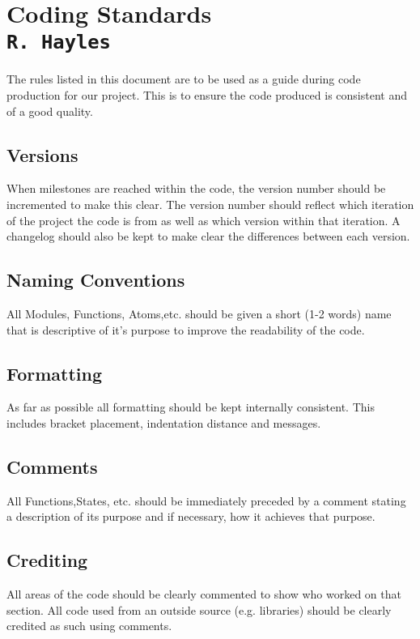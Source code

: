 \section{Coding Standards\\{\small\tt R.~Hayles}}
The rules listed in this document are to be used as a guide during code production for our project. This is to ensure the code produced is consistent and of a good quality.

\subsection{Versions}
When milestones are reached within the code, the version number should be incremented to make this clear. The version number should reflect which iteration of the project the code is from as well as which version within that iteration. A changelog should also be kept to make clear the differences between each version.
\subsection{Naming Conventions}
All Modules, Functions, Atoms,etc. should be given a short (1-2 words) name that is descriptive of it's purpose to improve the readability of the code.
\subsection{Formatting}
As far as possible all formatting should be kept internally consistent. This includes bracket placement, indentation distance and messages.\subsection{Comments}
All Functions,States, etc. should be immediately preceded by a comment stating a description of its purpose and if necessary, how it achieves that purpose.
\subsection{Crediting}
All areas of the code should be clearly commented to show who worked on that section.
All code used from an outside source (e.g. libraries) should be clearly credited as such  using comments.
\clearpage
\endinput
